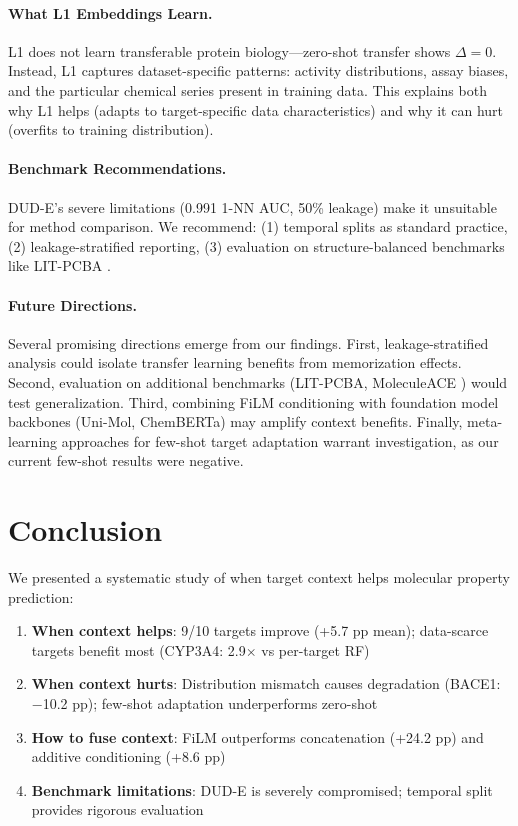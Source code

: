\documentclass{article}
\begin{document}
\paragraph{What L1 Embeddings Learn.}
L1 does not learn transferable protein biology---zero-shot transfer shows $\Delta = 0$. Instead, L1 captures dataset-specific patterns: activity distributions, assay biases, and the particular chemical series present in training data. This explains both why L1 helps (adapts to target-specific data characteristics) and why it can hurt (overfits to training distribution).

\paragraph{Benchmark Recommendations.}
DUD-E's severe limitations (0.991 1-NN AUC, 50\% leakage) make it unsuitable for method comparison. We recommend: (1) temporal splits as standard practice, (2) leakage-stratified reporting, (3) evaluation on structure-balanced benchmarks like LIT-PCBA \citep{tran_2020_litpcba}.

\paragraph{Future Directions.}
Several promising directions emerge from our findings. First, leakage-stratified analysis could isolate transfer learning benefits from memorization effects. Second, evaluation on additional benchmarks (LIT-PCBA, MoleculeACE \citep{van_tilborg_2024_moleculeace}) would test generalization. Third, combining FiLM conditioning with foundation model backbones (Uni-Mol, ChemBERTa) may amplify context benefits. Finally, meta-learning approaches for few-shot target adaptation warrant investigation, as our current few-shot results were negative.

\section{Conclusion}
\label{sec:conclusion}

We presented a systematic study of when target context helps molecular property prediction:
\begin{enumerate}[noitemsep,topsep=2pt]
\item \textbf{When context helps}: 9/10 targets improve (+5.7 pp mean); data-scarce targets benefit most (CYP3A4: 2.9$\times$ vs per-target RF)
\item \textbf{When context hurts}: Distribution mismatch causes degradation (BACE1: $-$10.2 pp); few-shot adaptation underperforms zero-shot
\item \textbf{How to fuse context}: FiLM outperforms concatenation (+24.2 pp) and additive conditioning (+8.6 pp)
\item \textbf{Benchmark limitations}: DUD-E is severely compromised; temporal split provides rigorous evaluation
\end{enumerate}
\end{document}
